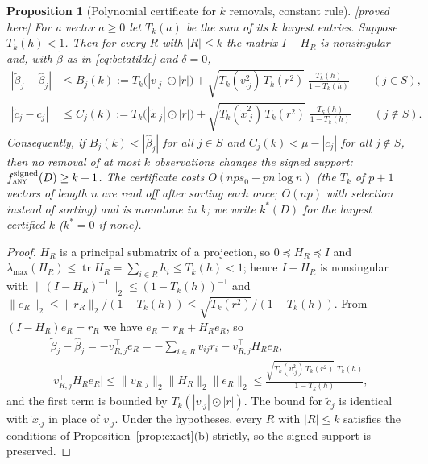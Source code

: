 \documentclass[10pt,a4paper]{article}
\theoremstyle{plain}
\newtheorem{proposition}[theorem]{Proposition}
\theoremstyle{definition}
\theoremstyle{remark}
\newcommand{\tr}{\operatorname{tr}}
\newcommand{\status}[1]{\textnormal{\textsf{\small [#1]}}}
\newcommand{\Tk}{T_k}
\newcommand{\tsc}[1]{\textnormal{\textsc{#1}}}  %
\begin{document}
\begin{proposition}[Polynomial certificate for $k$ removals, constant rule]\label{prop:cert}\status{proved here}
For a vector $a\ge0$ let $\Tk(a)$ be the sum of its $k$ largest entries. Suppose $\Tk(h)<1$. Then for every $R$ with $|R|\le k$ the matrix $I-H_R$ is nonsingular and, with $\tilde\beta$ as in \eqref{eq:betatilde} and $\delta=0$,
\begin{align*}
|\tilde\beta_j-\hat\beta_j|&\le B_j(k):=\Tk\bigl(|v_{\cdot j}|\odot|r|\bigr)+\sqrt{\Tk(v_{\cdot j}^2)\,\Tk(r^2)}\;\frac{\Tk(h)}{1-\Tk(h)}\qquad(j\in S),\\
|\tilde c_j-c_j|&\le C_j(k):=\Tk\bigl(|\tilde x_{\cdot j}|\odot|r|\bigr)+\sqrt{\Tk(\tilde x_{\cdot j}^2)\,\Tk(r^2)}\;\frac{\Tk(h)}{1-\Tk(h)}\qquad(j\notin S).
\end{align*}
Consequently, if $B_j(k)<|\hat\beta_j|$ for all $j\in S$ and $C_j(k)<\mu-|c_j|$ for all $j\notin S$, then no removal of at most $k$ observations changes the signed support: $f^{\mathrm{signed}}_{\tsc{any}}(D)\ge k+1$. The certificate costs $O(nps_0+pn\log n)$ (the $T_k$ of $p+1$ vectors of length $n$ are read off after sorting each once; $O(np)$ with selection instead of sorting) and is monotone in $k$; we write $k^\ast(D)$ for the largest certified $k$ ($k^\ast=0$ if none).
\end{proposition}
\begin{proof}
$H_R$ is a principal submatrix of a projection, so $0\preceq H_R\preceq I$ and $\lambda_{\max}(H_R)\le\tr H_R=\sum_{i\in R}h_i\le\Tk(h)<1$; hence $I-H_R$ is nonsingular with $\lVert(I-H_R)^{-1}\rVert_2\le(1-\Tk(h))^{-1}$ and $\lVert e_R\rVert_2\le\lVert r_R\rVert_2/(1-\Tk(h))\le\sqrt{\Tk(r^2)}/(1-\Tk(h))$. From $(I-H_R)e_R=r_R$ we have $e_R=r_R+H_Re_R$, so
\begin{gather*}
\tilde\beta_j-\hat\beta_j=-v_{R,j}^{\top}e_R=-\sum_{i\in R}v_{ij}r_i-v_{R,j}^{\top}H_Re_R ,\\
\bigl|v_{R,j}^{\top}H_Re_R\bigr|\le\lVert v_{R,j}\rVert_2\lVert H_R\rVert_2\lVert e_R\rVert_2\le\frac{\sqrt{\Tk(v^2_{\cdot j})\,\Tk(r^2)}\;\Tk(h)}{1-\Tk(h)},
\end{gather*}
and the first term is bounded by $\Tk(|v_{\cdot j}|\odot|r|)$. The bound for $\tilde c_j$ is identical with $\tilde x_{\cdot j}$ in place of $v_{\cdot j}$. Under the hypotheses, every $R$ with $|R|\le k$ satisfies the conditions of Proposition~\ref{prop:exact}(b) strictly, so the signed support is preserved.
\end{proof}
\end{document}
